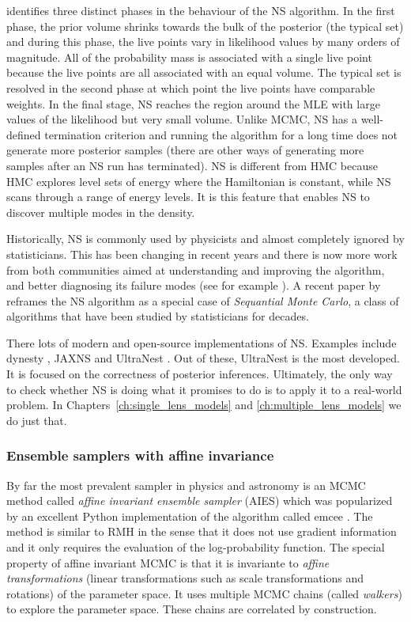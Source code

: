 \documentclass[12pt,dvipsnames]{report}
\newcommand{\ssf}[1]{\textsf{#1}}
\begin{document}
\citet{arXiv:2101.09675} identifies three distinct phases in the behaviour 
of the NS algorithm. In the first phase, the prior volume shrinks towards the 
bulk of the posterior (the typical set) and during this phase, the live points 
vary in likelihood values by many orders of magnitude. All of the probability mass is 
associated with a single live point because the live points are all associated 
with an equal volume. 
The typical set is resolved in the second phase at which point the live points have 
comparable weights.  In the final stage, NS reaches the region around the MLE 
with large values of the likelihood but very small volume.
Unlike MCMC, NS has a well-defined termination criterion and running the algorithm 
for a long time does not generate more posterior samples (there are other ways 
of generating more samples after an NS run has terminated).
NS is different from HMC because HMC explores level sets of energy where 
the Hamiltonian is constant, while NS scans through a range of energy levels. 
It is this feature that enables NS to discover multiple modes in the density.


Historically, NS is commonly used by physicists and almost completely 
ignored by statisticians. This has been changing in recent years and there 
is now more work from both communities aimed at understanding and improving the 
algorithm, and better diagnosing its failure modes (see for example 
\citet{ arXiv:1407.5459,arXiv:1804.06406,arXiv:1704.03459,arXiv:2101.09675}).
A recent paper by \citet{arXiv:1805.03924}  reframes the NS 
algorithm as a special case of \emph{Sequantial Monte Carlo}, a class of 
algorithms that have been studied by statisticians for decades.

There lots of modern and open-source implementations of NS. Examples include
\ssf{dynesty} \citep{2020MNRAS.493.3132S}, \ssf{JAXNS} \citep{arXiv:2012.15286}
and \ssf{UltraNest} \citep{2021JOSS....6.3001B}. 
Out of these, \ssf{UltraNest} is the most developed. It is 
focused on the correctness of posterior inferences. Ultimately, the only way 
to check whether NS is doing what it promises to do is to apply it to a real-world
problem. In Chapters~\ref{ch:single_lens_models} and \ref{ch:multiple_lens_models}
we do just that.

\subsubsection{Ensemble samplers with affine invariance}
By far the most prevalent sampler in physics and astronomy is an MCMC method 
called \emph{affine invariant ensemble sampler} (AIES)
\citep{2010CAMCS...5...65G} which was popularized by an excellent \ssf{Python}
implementation of the algorithm called \ssf{emcee} 
\citep{arXiv:1202.3665,arXiv:1911.07688}. The method is similar 
to RMH  in the sense that it does not use gradient information and it only requires 
the evaluation of the log-probability function. The special property 
of affine invariant MCMC is that it is invariante to 
\emph{affine transformations} (linear transformations such as 
scale transformations and rotations) of the parameter space. It uses multiple 
MCMC chains (called \emph{walkers}) to explore the parameter space. These chains are
correlated by construction. 
\end{document}
